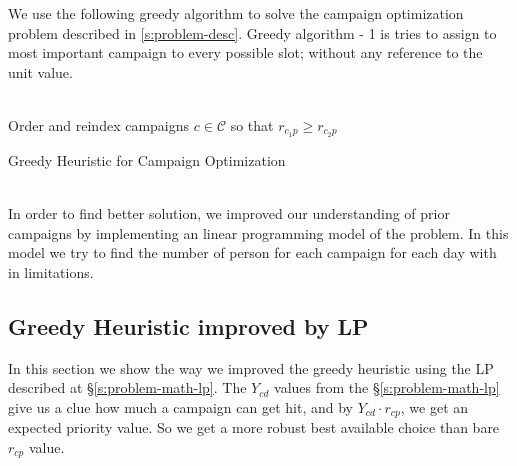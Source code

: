 \documentclass[11pt]{article}
\begin{document}
We use the following greedy algorithm to solve the campaign optimization problem described in \ref{s:problem-desc}. Greedy algorithm - 1 is tries to assign to most important campaign to every possible slot; without any reference to the unit value.

\begin{algorithm}[H]
\\
Order and reindex campaigns $c\in\mathcal{C}$ so that $r_{c_{1}p} \geq r_{c_{2}p}$
\\
\;
\caption{Greedy Heuristic for Campaign Optimization}
\label{algo:greedy_impl1}
\end{algorithm}\\

In order to find better solution, we improved our understanding of prior campaigns by implementing an linear programming model of the problem. In this model we try to find the number of person for each campaign for each day with in limitations.


\subsection{Greedy Heuristic improved by LP} \label{s:greedy_heuristic_improved}
In this section we show the way we improved the greedy heuristic using the LP described at \S \ref{s:problem-math-lp}. The $Y_{{c}{d}}$ values from the \S \ref{s:problem-math-lp} give us a clue how much a campaign can get hit, and by $Y_{{c}{d}}\cdot r_{{c}{p}}$, we get an expected priority value. So we get a more robust best available choice than bare $r_{{c}{p}}$ value.\\
\end{document}
